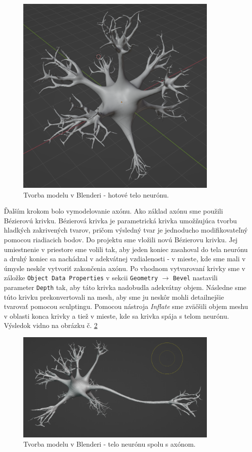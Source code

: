 \begin{figure}[!htbp]
  \centering
  \includegraphics[width=10cm]{img/n3-crop.png}
  \caption{Tvorba modelu v Blenderi - hotové telo neurónu.}
  \label{blender3}
\end{figure}	

Ďalším krokom bolo vymodelovanie axónu. Ako základ axónu sme použili Bézierovú krivku. Bézierová krivka je parametrická krivka umožňujúca tvorbu hladkých zakrivených tvarov, pričom výsledný tvar je
jednoducho modifikovateľný pomocou riadiacich bodov. Do projektu sme vložili novú Bézierovu krivku. Jej umiestnenie v priestore sme volili tak, aby jeden koniec zasahoval do tela neurónu 
a druhý koniec sa nachádzal v adekvátnej vzdialenosti - v mieste, kde sme mali v úmysle neskôr vytvoriť zakončenia axónu. Po vhodnom vytvarovaní krivky sme v záložke \texttt{Object Data Properties}
v sekcii \texttt{Geometry} $\rightarrow$ \texttt{Bevel} nastavili parameter \texttt{Depth} tak, aby táto krivka nadobudla adekvátny objem. Následne sme túto krivku prekonvertovali na mesh, aby 
sme ju neskôr mohli detailnejšie tvarovať pomocou sculptingu. 
Pomocou nástroja \emph{Inflate} sme zväčšili objem meshu v oblasti konca krivky a tiež v mieste, kde sa krivka spája s telom neurónu. Výsledok vidno na obrázku č. \ref{blender4}

\begin{figure}[!htbp]
  \centering
  \includegraphics[width=10cm]{img/n5-crop.png}
  \caption{Tvorba modelu v Blenderi - telo neurónu spolu s axónom.}
  \label{blender4}
\end{figure}	

